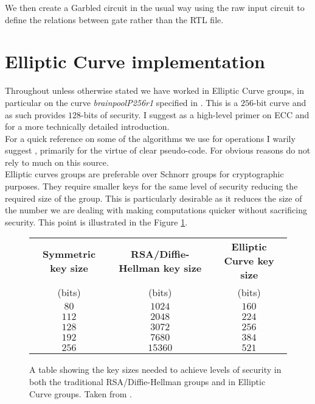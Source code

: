 \documentclass[ %
                    author={Nicholas Tutte},
                supervisor={Prof. Nigel Smart},
                    degree={MEng},
                     title={Secure Two Party Computation},
                  subtitle={A practical comparison of recent protocols},
                      type={Research - GG1K},
                      year={2015} ]{dissertation}
\begin{document}
				We then create a Garbled circuit in the usual way using the raw input circuit to define the relations between gate rather than the RTL file.

		\section{Elliptic Curve implementation}

			Throughout unless otherwise stated we have worked in Elliptic Curve groups, in particular on the curve \emph{brainpoolP256r1} specified in \cite{BrainpoolSpecifications}. This is a $256$-bit curve and as such provides $128$-bits of security. I suggest \cite{ECC_Primer} as a high-level primer on ECC and \cite{ECC_RFC_6090} for a more technically detailed introduction.\\

			For a quick reference on some of the algorithms we use for operations I warily suggest \cite{Wiki_ECC}, primarily for the virtue of clear pseudo-code. For obvious reasons do not rely to much on this source.\\

			Elliptic curves groups are preferable over Schnorr groups for cryptographic purposes. They require smaller keys for the same level of security reducing the required size of the group. This is particularly desirable as it reduces the size of the number we are dealing with making computations quicker without sacrificing security. This point is illustrated in the Figure \ref{fig:NSA_ECC_Table}.\\

			\begin{figure}[!htb]
				\begin{tabular}{| c | c | c |}
					\hline
					\textbf{Symmetric key size} & \textbf{RSA/Diffie-Hellman key size} & \textbf{Elliptic Curve key size} \\
					(bits) & (bits) & (bits) \\
					\hline
					\hline
					$80$ & $1024$ & $160$ \\
					\hline
					$112$ & $2048$ & $224$ \\
					\hline
					$128$ & $3072$ & $256$ \\
					\hline
					$192$ & $7680$ & $384$ \\
					\hline
					$256$ & $15360$ & $521$ \\
					\hline
				\end{tabular}

				\caption{A table showing the key sizes needed to achieve levels of security in both the traditional RSA/Diffie-Hellman groups and in Elliptic Curve groups. Taken from \cite{NSA_CaseForECC}. \label{fig:NSA_ECC_Table}}
			\end{figure}
\end{document}
